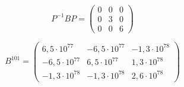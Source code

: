 \begin{enumerate}
	$$
	P^{-1}BP = 
	\begin{pmatrix}
		0 & 0 & 0 \\
		0 & 3 & 0 \\
		0 & 0 & 6
	\end{pmatrix}
	$$
	
	$$
	B^{101} =
	\begin{pmatrix}
		 6,5\cdot 10^{77} & - 6,5 \cdot 10^{77} & -1,3 \cdot 10^78 \\
		-6,5\cdot 10^{77} &   6,5 \cdot 10^{77} & 1,3 \cdot 10^78 \\
		-1,3 \cdot 10^{78} & - 1,3 \cdot 10^{78} & 2,6 \cdot 10^{78}
	\end{pmatrix}	
	$$
\end{enumerate}